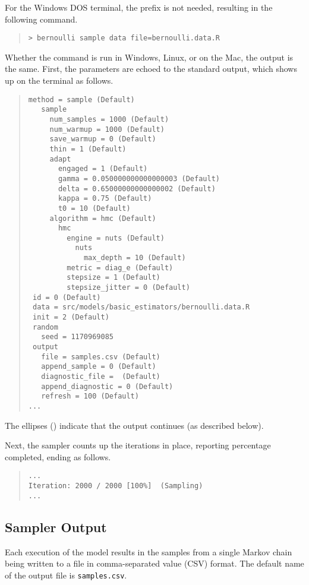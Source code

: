 For the Windows DOS terminal, the  prefix is not needed,
resulting in the following command.
%
\begin{quote}
\begin{Verbatim}[fontshape=sl,fontsize=\small]
> bernoulli sample data file=bernoulli.data.R
\end{Verbatim}
\end{quote}
%
Whether the command is run in Windows, Linux, or on the Mac, the
output is the same.  First, the parameters are echoed to the standard output,
which shows up on the terminal as follows.
%
\begin{quote}
\begin{Verbatim}[fontsize=\small]
 method = sample (Default)
   sample
     num_samples = 1000 (Default)
     num_warmup = 1000 (Default)
     save_warmup = 0 (Default)
     thin = 1 (Default)
     adapt
       engaged = 1 (Default)
       gamma = 0.050000000000000003 (Default)
       delta = 0.65000000000000002 (Default)
       kappa = 0.75 (Default)
       t0 = 10 (Default)
     algorithm = hmc (Default)
       hmc
         engine = nuts (Default)
           nuts
             max_depth = 10 (Default)
         metric = diag_e (Default)
         stepsize = 1 (Default)
         stepsize_jitter = 0 (Default)
 id = 0 (Default)
 data = src/models/basic_estimators/bernoulli.data.R
 init = 2 (Default)
 random
   seed = 1170969085
 output
   file = samples.csv (Default)
   append_sample = 0 (Default)
   diagnostic_file =  (Default)
   append_diagnostic = 0 (Default)
   refresh = 100 (Default)
...
\end{Verbatim}
\end{quote}
%
The ellipses () indicate that the output continues (as
described below).

Next, the sampler counts up the iterations in place, reporting
percentage completed, ending as follows.
%
\begin{quote}
\begin{Verbatim}[fontsize=\small]
...
Iteration: 2000 / 2000 [100%]  (Sampling)
...
\end{Verbatim}
\end{quote}

\subsection{Sampler Output}

Each execution of the model results in the samples from a single
Markov chain being written to a file in comma-separated value (CSV) format.
The default name of the output file is \nolinkurl{samples.csv}.

